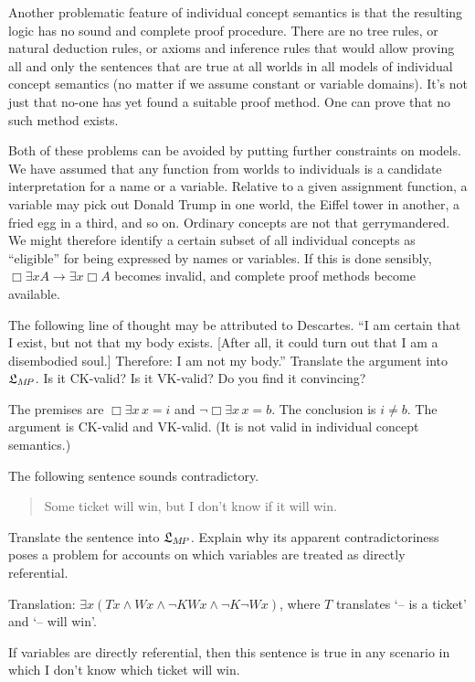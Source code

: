 Another problematic feature of individual concept semantics is that the
resulting logic has no sound and complete proof procedure. There are no tree
rules, or natural deduction rules, or axioms and inference rules that would
allow proving all and only the sentences that are true at all worlds in all
models of individual concept semantics (no matter if we assume constant or
variable domains). It's not just that no-one has yet found a suitable proof
method. One can prove that no such method exists.

Both of these problems can be avoided by putting further constraints on models.
We have assumed that any function from worlds to individuals is a candidate
interpretation for a name or a variable. Relative to a given assignment
function, a variable may pick out Donald Trump in one world, the Eiffel tower in
another, a fried egg in a third, and so on. Ordinary concepts are not that
gerrymandered. We might therefore identify a certain subset of all individual
concepts as ``eligible'' for being expressed by names or variables. If this is
done sensibly, $\Box \exists x A \to \exists x \Box A$ becomes invalid, and
complete proof methods become available.

\begin{exercise}
  The following line of thought may be attributed to Descartes. ``I am certain
  that I exist, but not that my body exists. [After all, it could turn out that
  I am a disembodied soul.] Therefore: I am not my body.'' Translate the
  argument into $\mathfrak{L}_{M\!P}$. Is it CK-valid? Is it VK-valid? Do you find it
  convincing?
\end{exercise}
\begin{solution}
  The premises are $\Box \exists x\, x\!=\!i$ and
  $\neg\Box \exists x\, x\!=\!b$. The conclusion is $i\!\not=\!b$. The argument
  is CK-valid and VK-valid. (It is not valid in individual concept semantics.)
\end{solution}

\begin{exercise}
  The following sentence sounds contradictory.
  \begin{quote}
    Some ticket will win, but I don't know if it will win.
  \end{quote}
  Translate the sentence into $\mathfrak{L}_{M\!P}$. Explain why its apparent
  contradictoriness poses a problem for accounts on which variables are treated
  as directly referential.
\end{exercise}
\begin{solution}
  Translation: $\exists x (Tx \land Wx \land \neg K Wx \land \neg K \neg Wx)$,
  where $T$ translates `-- is a ticket' and `-- will win'.

  If variables are directly referential, then this sentence is true in any
  scenario in which I don't know which ticket will win.
\end{solution}

